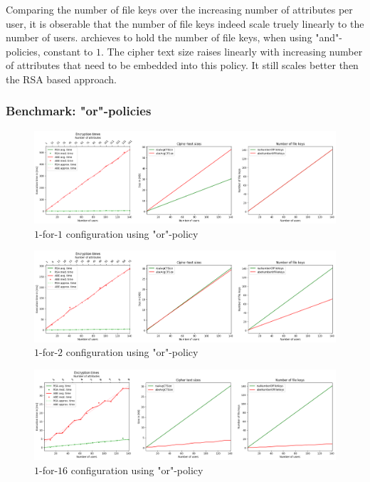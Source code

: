 Comparing the number of file keys over the increasing number of attributes per user, it is obserable that the number of file keys indeed scale truely linearly to the number of users. \name archieves to hold the number of file keys, when using "and"-policies, constant to $1$. The cipher text size raises linearly with increasing number of attributes that need to be embedded into this policy. It still scales better then the RSA based approach. 

\subsubsection{Benchmark: "or"-policies}
\begin{figure}[!t]
\centering
    \includegraphics[width=\linewidth]{img/eval-or-policy/encrypt_incrementing_10_attribute_increment_1per1User.png}
    \caption{$1$-for-$1$ configuration using "or"-policy}
    \label{fig:1-for-1-or}
\end{figure}
\begin{figure}[!t]
\centering
    \includegraphics[width=\linewidth]{img/eval-or-policy/encrypt_incrementing_10_attribute_increment_1per2User.png}
    \caption{$1$-for-$2$ configuration using "or"-policy}
    \label{fig:1-for-2-or}
\end{figure}
\begin{figure}[!t]
\centering
    \includegraphics[width=\linewidth]{img/eval-or-policy/encrypt_incrementing_10_attribute_increment_1per16User.png}
    \caption{$1$-for-$16$ configuration using "or"-policy}
    \label{fig:1-for-16-or}
\end{figure}
